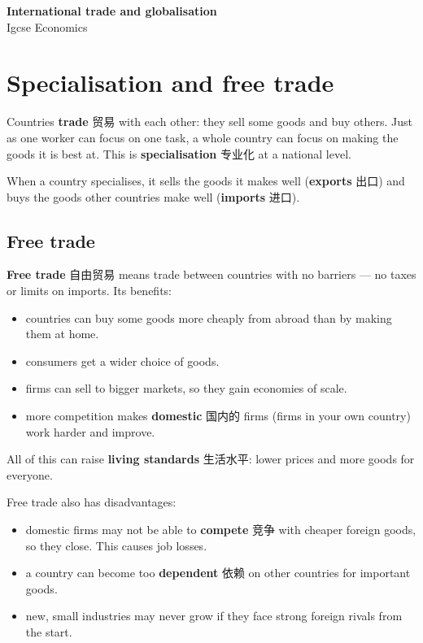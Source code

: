 \documentclass[11pt]{article}
\begin{document}
\begin{center}
  {\LARGE\bfseries International trade and globalisation}\\[0.35em]
  {\large Igcse Economics}
\end{center}
\vspace{0.6em}

\section*{Specialisation and free trade}

Countries \textbf{trade} 贸易 with each other: they sell some goods and buy others. Just as one worker can focus on one task, a whole country can focus on making the goods it is best at. This is \textbf{specialisation} 专业化 at a national level.

When a country specialises, it sells the goods it makes well (\textbf{exports} 出口) and buys the goods other countries make well (\textbf{imports} 进口).

\subsection*{Free trade}

\textbf{Free trade} 自由贸易 means trade between countries with no barriers — no taxes or limits on imports. Its benefits:

\begin{itemize}
\item countries can buy some goods more cheaply from abroad than by making them at home.

\item consumers get a wider choice of goods.

\item firms can sell to bigger markets, so they gain economies of scale.

\item more competition makes \textbf{domestic} 国内的 firms (firms in your own country) work harder and improve.

\end{itemize}

All of this can raise \textbf{living standards} 生活水平: lower prices and more goods for everyone.

Free trade also has disadvantages:

\begin{itemize}
\item domestic firms may not be able to \textbf{compete} 竞争 with cheaper foreign goods, so they close. This causes job losses.

\item a country can become too \textbf{dependent} 依赖 on other countries for important goods.

\item new, small industries may never grow if they face strong foreign rivals from the start.

\end{itemize}
\end{document}
